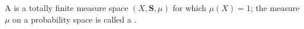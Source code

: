 A  is a totally finite measure space $(X, \mathbf{S}, \mu)$ for which $\mu(X) = 1$; the measure $\mu$ on a probability space is called a .
